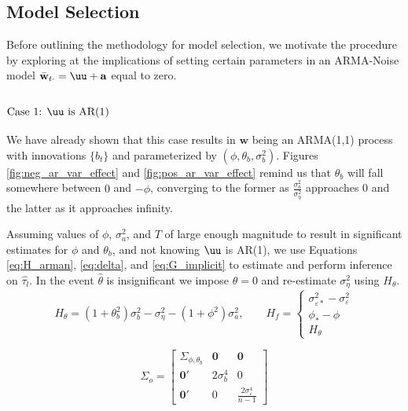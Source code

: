\subsection{Model Selection}
Before outlining the methodology for model selection, we motivate the procedure by exploring at the implications of setting certain parameters in an ARMA-Noise model $\bar{\mathbf{w}}_{t\cdot} = \uu + \mathbf{a} $ equal to zero.


\subsubsection{${\text{Case 1: } \uu \text{ is AR(1)}}$}



We have already shown that this case results in $\mathbf{w}$ being an ARMA(1,1) process with innovations $\{b_t\}$ and parameterized by $(\phi,\theta_b,\sigma_b^2)$. Figures \ref{fig:neg_ar_var_effect} and \ref{fig:pos_ar_var_effect} remind us that $\theta_b$ will fall somewhere between $0$ and $-\phi$, converging to the former as $\frac{\sigma_a^2}{\sigma_\eta^2}$ approaches 0 and the latter as it approaches infinity.


Assuming values of $\phi$, $\sigma_a^2$, and $T$ of large enough magnitude to result in significant estimates for $\phi$ and $\theta_b$, and not knowing $\uu$ is AR(1), we use  Equations \ref{eq:H_arman}, \ref{eq:delta}, and \ref{eq:G_implicit} to estimate and perform inference on $\hat{\tau_l}$. In the event $\hat{\theta}$ is insignificant we impose  $\theta = 0$ and re-estimate $\sigma_\eta^2$ using $H_\theta$.
\begin{equation}
    \label{eq:H_theta}
    H_\theta = (1+\theta_b^2)\sigma_b^2 - \sigma_\eta^2 - (1 + \phi^2)\sigma_a^2, \qquad  H_f = \begin{cases}
    \sigma_{\varepsilon*}^2 - \sigma_\varepsilon^2 \\
    \phi_* - \phi \\
    H_\theta
\end{cases}  
\end{equation}

\begin{equation}
    \label{eq:Sigma_o_theta_zero}
    \Sigma_o = \left[\begin{array}{ccc}
        \Sigma_{\phi,\theta_b} & \mathbf{0}  & \mathbf{0} \\
        \mathbf{0}' & 2\sigma_b^4 & 0\\
        \mathbf{0}' & 0 & \frac{2\sigma_\varepsilon^4}{n-1}
    \end{array}\right]
\end{equation}


